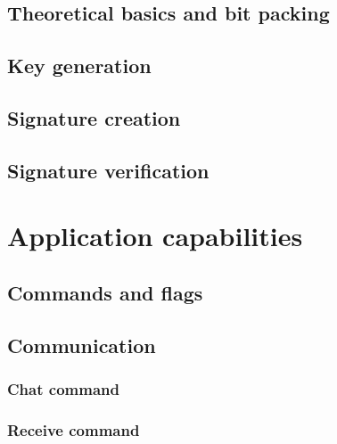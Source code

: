 \section{Theoretical basics and bit packing}
\label{sec:dil_bit_pack}


\section{Key generation}
\label{sec:dil_keygen}


\section{Signature creation}
\label{sec:dil_sign}


\section{Signature verification}
\label{sec:dil_verify}


\chapter{Application capabilities}
\label{ch:app_capab}


\section{Commands and flags}
\label{sec:options}


\section{Communication}
\label{sec:cmd_app}


\subsection{Chat command}
\label{subsec:cmd_app_chat}


\subsection{Receive command}
\label{sec:cmd_app_recv}


